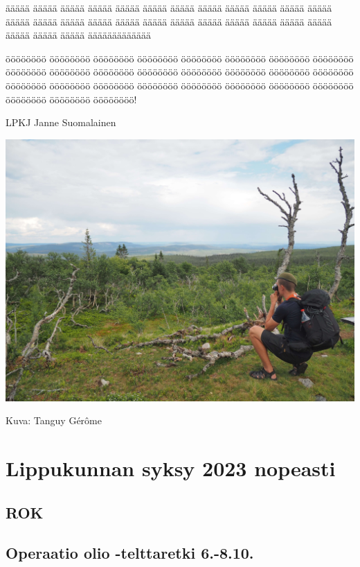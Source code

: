 \documentclass[10pt,finnish,a5paper,headings=small,twoside=semi]{scrartcl}
\begin{document}

\begin{multicols}{2}


\noindent äääää äääää äääää äääää äääää äääää äääää äääää äääää äääää äääää äääää äääää äääää äääää äääää äääää äääää äääää äääää äääää äääää äääää äääää äääää äääää äääää äääääääääääää

öööööööö öööööööö öööööööö öööööööö öööööööö öööööööö öööööööö öööööööö öööööööö öööööööö öööööööö öööööööö öööööööö öööööööö öööööööö öööööööö öööööööö öööööööö öööööööö öööööööö öööööööö öööööööö öööööööö öööööööö öööööööö öööööööö öööööööö! \\

\vspace*{0.50cm}

\null\hfill LPKJ Janne Suomalainen

\end{multicols}


\medskip
\noindent\includegraphics[width=\linewidth]{assets/lpkjtervehdys}

\medskip
\noindent\null\hfill Kuva: Tanguy Gérôme

\clearpage\section{Lippukunnan syksy 2023 nopeasti}
	\subsection{ROK}
	\subsection{Operaatio olio -telttaretki 6.-8.10.}
\end{document}
